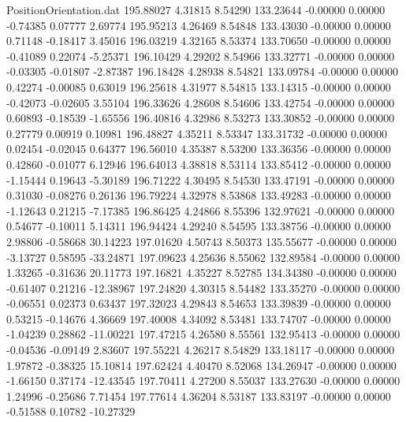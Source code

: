 \begin{filecontents}{PositionOrientation.dat}
 195.88027    4.31815    8.54290   133.23644   -0.00000    0.00000   -0.74385    0.07777    2.69774
 195.95213    4.26469    8.54848   133.43030   -0.00000    0.00000    0.71148   -0.18417    3.45016
 196.03219    4.32165    8.53374   133.70650   -0.00000    0.00000   -0.41089    0.22074   -5.25371
 196.10429    4.29202    8.54966   133.32771   -0.00000    0.00000   -0.03305   -0.01807   -2.87387
 196.18428    4.28938    8.54821   133.09784   -0.00000    0.00000    0.42274   -0.00085    0.63019
 196.25618    4.31977    8.54815   133.14315   -0.00000    0.00000   -0.42073   -0.02605    3.55104
 196.33626    4.28608    8.54606   133.42754   -0.00000    0.00000    0.60893   -0.18539   -1.65556
 196.40816    4.32986    8.53273   133.30852   -0.00000    0.00000    0.27779    0.00919    0.10981
 196.48827    4.35211    8.53347   133.31732   -0.00000    0.00000    0.02454   -0.02045    0.64377
 196.56010    4.35387    8.53200   133.36356   -0.00000    0.00000    0.42860   -0.01077    6.12946
 196.64013    4.38818    8.53114   133.85412   -0.00000    0.00000   -1.15444    0.19643   -5.30189
 196.71222    4.30495    8.54530   133.47191   -0.00000    0.00000    0.31030   -0.08276    0.26136
 196.79224    4.32978    8.53868   133.49283   -0.00000    0.00000   -1.12643    0.21215   -7.17385
 196.86425    4.24866    8.55396   132.97621   -0.00000    0.00000    0.54677   -0.10011    5.14311
 196.94424    4.29240    8.54595   133.38756   -0.00000    0.00000    2.98806   -0.58668   30.14223
 197.01620    4.50743    8.50373   135.55677   -0.00000    0.00000   -3.13727    0.58595  -33.24871
 197.09623    4.25636    8.55062   132.89584   -0.00000    0.00000    1.33265   -0.31636   20.11773
 197.16821    4.35227    8.52785   134.34380   -0.00000    0.00000   -0.61407    0.21216  -12.38967
 197.24820    4.30315    8.54482   133.35270   -0.00000    0.00000   -0.06551    0.02373    0.63437
 197.32023    4.29843    8.54653   133.39839   -0.00000    0.00000    0.53215   -0.14676    4.36669
 197.40008    4.34092    8.53481   133.74707   -0.00000    0.00000   -1.04239    0.28862  -11.00221
 197.47215    4.26580    8.55561   132.95413   -0.00000    0.00000   -0.04536   -0.09149    2.83607
 197.55221    4.26217    8.54829   133.18117   -0.00000    0.00000    1.97872   -0.38325   15.10814
 197.62424    4.40470    8.52068   134.26947   -0.00000    0.00000   -1.66150    0.37174  -12.43545
 197.70411    4.27200    8.55037   133.27630   -0.00000    0.00000    1.24996   -0.25686    7.71454
 197.77614    4.36204    8.53187   133.83197   -0.00000    0.00000   -0.51588    0.10782  -10.27329

\end{filecontents}
